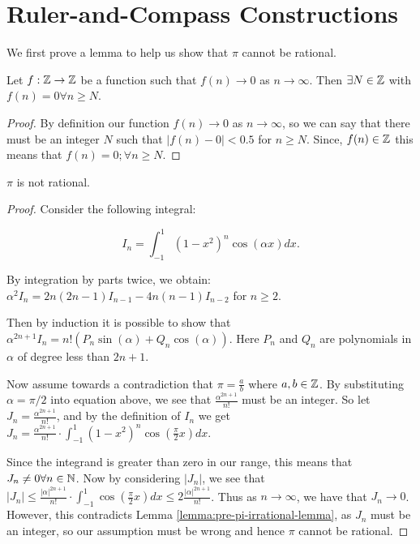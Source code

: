 \section{Ruler-and-Compass Constructions}
We first prove a lemma to help us show that $\pi$ cannot be rational.

\begin{lemma}\label{lemma:pre-pi-irrational-lemma}
    Let $f:\mathbb Z \rightarrow \mathbb Z$ be a function such that $f(n)\rightarrow 0$ as $n \rightarrow \infty$. Then $\exists N \in \mathbb Z$ with $f(n)=0 \forall n\geq N$.
\end{lemma}

\begin{proof}
    By definition our function $f(n) \rightarrow 0$ as $n \rightarrow \infty$, so we can say that there must be an integer $N$ such that $|f(n)-0|<0.5$ for $n\geq N$. Since, $f(n) \in \mathbb Z$ this means that $f(n)=0; \forall n \geq N$.
\end{proof}

\begin{theorem}
    $\pi$ is not rational.
\end{theorem}

\begin{proof}

    Consider the following integral:

    $$I_n = \int_{-1}^{1} (1-x^2)^n \cos(\alpha x)dx. $$

    By integration by parts twice, we obtain:
    $\alpha^2I_n=2n(2n-1)I_{n-1}-4n(n-1)I_{n-2}$ for $n\geq 2$.

    Then by induction it is possible to show that $\alpha^{2n+1}I_n=n!(P_n \sin(\alpha)+Q_n \cos(\alpha))$.
    Here $P_n$ and $Q_n$ are polynomials in $\alpha$ of degree less than $2n+1$.

    Now assume towards a contradiction that $\pi = \frac{a}{b}$ where $a,b\in \mathbb Z$. By substituting $\alpha = \pi/2$ into equation above, we see that $\frac{\alpha^{2n+1}}{n!}$ must be an integer. So let $J_n = \frac{\alpha^{2n+1}}{n!}$, and by the definition of $I_n$ we get $J_n = \frac{\alpha^{2n+1}}{n!}\cdot \int_{-1}^{1} (1-x^2)^n \cos(\frac{\pi}{2} x)dx$.

    Since the integrand is greater than zero in our range, this means that $J_n \neq 0 \forall n \in \mathbb N$. Now by considering $|J_n|$, we see that $|J_n| \leq \frac{|\alpha|^{2n+1}}{n!} \cdot \int_{-1}^1 \cos(\frac{\pi}{2}x)dx \leq 2\frac{|\alpha|^{2n+1}}{n!}$. Thus as $n\rightarrow \infty$, we have that $J_n\rightarrow 0$. However, this contradicts Lemma \ref{lemma:pre-pi-irrational-lemma}, as $J_n$ must be an integer, so our assumption must be wrong and hence $\pi$ cannot be rational.
\end{proof}

